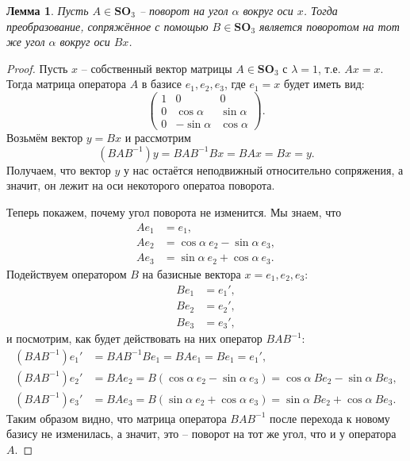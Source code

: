 \documentclass{article}
\newtheorem{lemma}{Лемма}[section]
\begin{document}
\begin{lemma} \label{vasek}
    Пусть $A \in \mathbf{SO}_3$ -- поворот на угол $\alpha$ вокруг оси $x$. Тогда преобразование, сопряжённое с помощью $B \in \mathbf{SO}_3$ является поворотом на тот же угол $\alpha$ вокруг оси $B x$.
\end{lemma}
\begin{proof}
    Пусть $x$ -- собственный вектор матрицы $A \in \mathbf{SO}_3$ с $\lambda = 1$, т.е. $Ax = x$. Тогда матрица оператора $A$ в базисе $e_1, e_2, e_3$, где $e_1 = x$ будет иметь вид:
    \[
        \begin{pmatrix}
            1 & 0 & 0 \\
            0 & \cos \alpha & \sin \alpha \\
            0 & -\sin \alpha & \cos \alpha
        \end{pmatrix}.
    \]
    Возьмём вектор $y = B x$ и рассмотрим $$ (B A B^{-1})y = B A B^{-1} B x = B A x = B x = y. $$ Получаем, что вектор $y$ у нас остаётся неподвижный относительно сопряжения, а значит, он лежит на оси некоторого оператоа поворота.

    Теперь покажем, почему угол поворота не изменится. Мы знаем, что 
    \begin{align*}
        A e_1 &= e_1, \\
        A e_2 &= \cos \alpha \ e_2 - \sin \alpha \ e_3, \\
        A e_3 &= \sin \alpha \ e_2 + \cos \alpha \ e_3.
    \end{align*}
    Подействуем оператором $B$ на базисные вектора $x = e_1, e_2, e_3$:
    \begin{align*}
        B e_1 &= e_1', \\
        B e_2 &= e_2', \\
        B e_3 &= e_3',
    \end{align*}
    и посмотрим, как будет действовать на них оператор $BAB^{-1}$:
    \begin{align*}
        (BAB^{-1})e_1' &= BAB^{-1}B e_1 = B A e_1 = B e_1 = e_1', \\
        (BAB^{-1})e_2' &= B A e_2 = B(\cos \alpha \ e_2 - \sin \alpha \ e_3) = \cos \alpha \ B e_2 - \sin \alpha \ B e_3, \\
        (BAB^{-1})e_3' &= B A e_3 = B(\sin \alpha \ e_2 + \cos \alpha \ e_3) = \sin \alpha \ B e_2 + \cos \alpha \ B e_3.
    \end{align*}
    Таким образом видно, что матрица оператора $BAB^{-1}$ после перехода к новому базису не изменилась, а значит, это -- поворот на тот же угол, что и у оператора $A$.
\end{proof}
\end{document}
